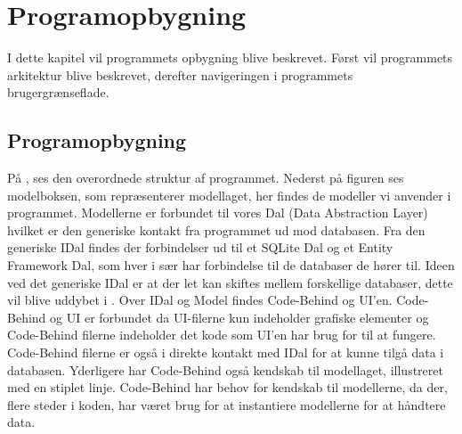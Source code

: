 \chapter{Programopbygning}

I dette kapitel vil programmets opbygning blive beskrevet. Først vil programmets arkitektur blive beskrevet, derefter navigeringen i programmets brugergrænseflade.


\section{Programopbygning}\label{sec:programopbygning}



På , ses den overordnede struktur af programmet.
Nederst på figuren ses modelboksen, som repræsenterer modellaget, her findes de modeller vi anvender i programmet.
Modellerne er forbundet til vores Dal (Data Abstraction Layer) hvilket er den generiske kontakt fra programmet ud mod databasen.
Fra den generiske IDal findes der forbindelser ud til et SQLite Dal og et Entity Framework Dal, som hver i sær har forbindelse til de databaser de hører til.
Ideen ved det generiske IDal er at der let kan skiftes mellem forskellige databaser, dette vil blive uddybet i .
Over IDal og Model findes Code-Behind og UI'en.
Code-Behind og UI er forbundet da UI-filerne kun indeholder grafiske elementer og Code-Behind filerne indeholder det kode som UI'en har brug for til at fungere.
Code-Behind filerne er også i direkte kontakt med IDal for at kunne tilgå data i databasen.
Yderligere har Code-Behind også kendskab til modellaget, illustreret med en stiplet linje.
Code-Behind har behov for kendskab til modellerne, da der, flere steder i koden, har været brug for at instantiere modellerne for at håndtere data. 

